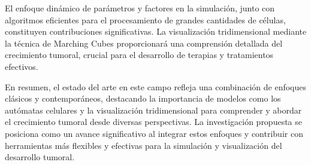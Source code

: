 El enfoque dinámico de parámetros y factores en la simulación, junto con algoritmos eficientes para el procesamiento de grandes cantidades de células, constituyen contribuciones significativas. La visualización tridimensional mediante la técnica de Marching Cubes proporcionará una comprensión detallada del crecimiento tumoral, crucial para el desarrollo de terapias y tratamientos efectivos.

En resumen, el estado del arte en este campo refleja una combinación de enfoques clásicos y contemporáneos, destacando la importancia de modelos como los autómatas celulares y la visualización tridimensional para comprender y abordar el crecimiento tumoral desde diversas perspectivas. La investigación propuesta se posiciona como un avance significativo al integrar estos enfoques y contribuir con herramientas más flexibles y efectivas para la simulación y visualización del desarrollo tumoral.